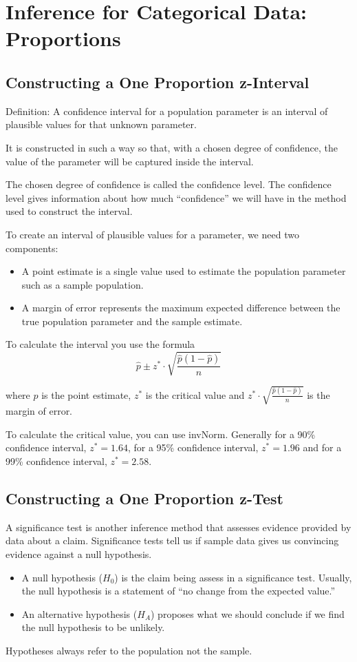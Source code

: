 \documentclass[../stats.tex]{subfiles}
\begin{document}
\chapter{Inference for Categorical Data: Proportions}
\section{Constructing a One Proportion z-Interval}
Definition: A confidence interval for a population parameter is an interval of plausible values for that unknown parameter.

It is constructed in such a way so that, with a chosen degree of confidence, the value of the parameter will be captured inside the interval.

The chosen degree of confidence is called the confidence level. The confidence level gives information about how much ``confidence'' we will have in the method used to construct the interval.

To create an interval of plausible values for a parameter, we need two components:
\begin{itemize}
    \item A point estimate is a single value used to estimate the population parameter such as a sample population.
    \item A margin of error represents the maximum expected difference between the true population parameter and the sample estimate.
\end{itemize}

To calculate the interval you use the formula 
\[ \hat{p}\pm z^*\cdot\sqrt{\frac{\hat{p}(1-\hat{p})}{n}}\]

where $\hat{p}$ is the point estimate, $z^*$ is the critical value and $z^*\cdot\sqrt{\frac{\hat{p}(1-\hat{p})}{n}}$ is the margin of error.

To calculate the critical value, you can use invNorm. Generally for a 90\% confidence interval, $z^*=1.64$, for a 95\% confidence interval, $z^*=1.96$ and for a 99\% confidence interval, $z^*=2.58$.

\section{Constructing a One Proportion z-Test}
A significance test is another inference method that assesses evidence provided by data about a claim. Significance tests tell us if sample data gives us convincing evidence against a null hypothesis.
\begin{itemize}
    \item A null hypothesis ($H_0$) is the claim being assess in a significance test. Usually, the null hypothesis is a statement of ``no change from the expected value.''
    \item An alternative hypothesis ($H_A$) proposes what we should conclude if we find the null hypothesis to be unlikely.
\end{itemize}
Hypotheses always refer to the population not the sample.
\end{document}
